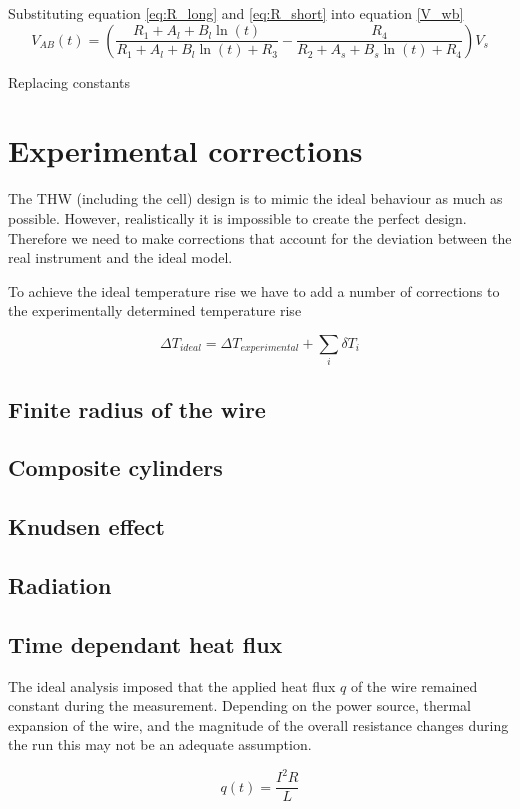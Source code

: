 \documentclass{article}
\begin{document}
\vspace{3mm}

Substituting equation \ref{eq:R_long} and \ref{eq:R_short} into equation \ref{V_wb}
$$V_{AB}(t) = \left( \frac{R_1 + A_l + B_l \ln (t)}{R_1 + A_l + B_l \ln (t) + R_3} - \frac{R_4}{R_2 + A_s + B_s \ln (t) + R_4} \right) V_{s}$$

Replacing constants 



\newpage

\section{Experimental corrections }
The THW (including the cell) design is to mimic the ideal behaviour as much as possible. However, realistically it is impossible to create the perfect design. Therefore we need to make corrections that account for the deviation between the real instrument and the ideal model.

To achieve the ideal temperature rise we have to add a number of corrections to the experimentally determined temperature rise

$$ \Delta T_{ideal} = \Delta T_{experimental} + \sum_{i} \delta T_i$$

\subsection{Finite radius of the wire}
\subsection{Composite cylinders}
\subsection{Knudsen effect}
\subsection{Radiation}
\subsection{Time dependant heat flux}
The ideal analysis imposed that the applied heat flux $q$ of the wire remained constant during the measurement. Depending on the power source, thermal expansion of the wire, and the magnitude of the overall resistance changes during the run this may not be an adequate assumption.

$$q(t) = \frac{I^2 R}{L}$$
\end{document}
